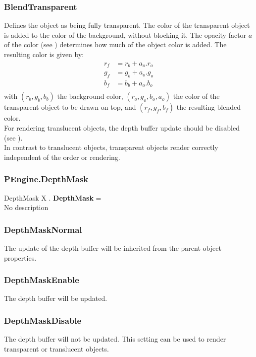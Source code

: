 \subsubsection{BlendTransparent \label{T:BlendType|BlendTransparent}}
Defines the object as being fully transparent. The color of the transparent object is added to the color of the background, without blocking it. The opacity factor $a$ of the color (see ) determines how much of the object color is added. The resulting color is given by:
\begin{equation}
\begin{array}{rcl}
r_f & = r_b + a_o . r_o \\
g_f & = g_b + a_o . g_o \\
b_f & = b_b + a_o . b_o \\
\end{array}
\end{equation}
with $(r_b,g_b,b_b)$ the background color, $(r_o,g_o,b_o,a_o)$ the color of the transparent object to be drawn on top, and $(r_f,g_f,b_f)$ the resulting blended color. \\
For rendering translucent objects, the depth buffer update should be disabled (see ). \\
In contrast to translucent objects, transparent objects render correctly independent of the order or rendering.

\subsubsection{PEngine.DepthMask \label{F:PEngine:DepthMask}}
DepthMask X . \textbf{DepthMask} = \\
No description

\subsubsection{DepthMaskNormal \label{T:DepthMask|DepthMaskNormal}}
The update of the depth buffer will be inherited from the parent object properties.

\subsubsection{DepthMaskEnable \label{T:DepthMask|DepthMaskEnable}}
The depth buffer will be updated.

\subsubsection{DepthMaskDisable \label{T:DepthMask|DepthMaskDisable}}
The depth buffer will not be updated. This setting can be used to render transparent or translucent objects.

